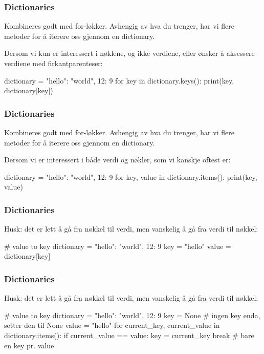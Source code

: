 \begin{frame}[fragile]
    \frametitle{Dictionaries}

    Kombineres godt med for-løkker. Avhengig av hva du trenger, har vi flere metoder for å iterere oss gjennom en dictionary. 

    Dersom vi kun er interessert i nøklene, og ikke verdiene, eller ønsker å aksessere verdiene med firkantparenteser: 

\begin{python}
dictionary = {"hello": "world", 12: 9}
for key in dictionary.keys(): 
    print(key, dictionary[key])
\end{python}

\end{frame}

\begin{frame}[fragile]
    \frametitle{Dictionaries}

    Kombineres godt med for-løkker. Avhengig av hva du trenger, har vi flere metoder for å iterere oss gjennom en dictionary. 

    Dersom vi er interessert i både verdi og nøkler, som vi kanskje oftest er: 

\begin{python}
dictionary = {"hello": "world", 12: 9}
for key, value in dictionary.items(): 
    print(key, value)
\end{python}

\end{frame}

\begin{frame}[fragile]
    \frametitle{Dictionaries}

    Husk: det er lett å gå fra nøkkel til verdi, men vanskelig å gå fra verdi til nøkkel: 

\begin{python}
# value to key
dictionary = {"hello": "world", 12: 9}
key = "hello"
value = dictionary[key]
\end{python}

\end{frame}

\begin{frame}[fragile]
    \frametitle{Dictionaries}

    Husk: det er lett å gå fra nøkkel til verdi, men vanskelig å gå fra verdi til nøkkel: 

\begin{python}
# value to key
dictionary = {"hello": "world", 12: 9}
key = None # ingen key enda, setter den til None
value = "hello"
for current_key, current_value in dictionary.items(): 
    if current_value == value: 
        key = current_key
        break # bare en key pr. value
\end{python}

\end{frame}












